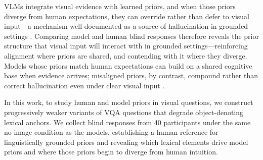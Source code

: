 VLMs integrate visual evidence with learned priors, and when those priors diverge
from human expectations, they can override rather than defer to visual input---a
mechanism well-documented as a source of hallucination in grounded settings
\citep{ji2023survey,rohrbach2018object}.
Comparing model and human blind responses therefore reveals the prior structure
that visual input will interact with in grounded settings---reinforcing alignment
where priors are shared, and contending with it where they diverge.
Models whose priors match human expectations can build on a shared cognitive base when evidence arrives; misaligned priors, by contrast, compound rather than correct hallucination even under clear visual input \citep{bar2007proactive,ji2023survey}.

In this work, to study human and model priors in visual questions, we construct progressively weaker variants of VQA questions that degrade object-denoting lexical
anchors. We collect blind responses from 40 participants under the same no-image condition as the models, establishing a human reference for linguistically grounded priors and revealing which lexical elements drive model priors and where those priors begin to diverge from human intuition.
